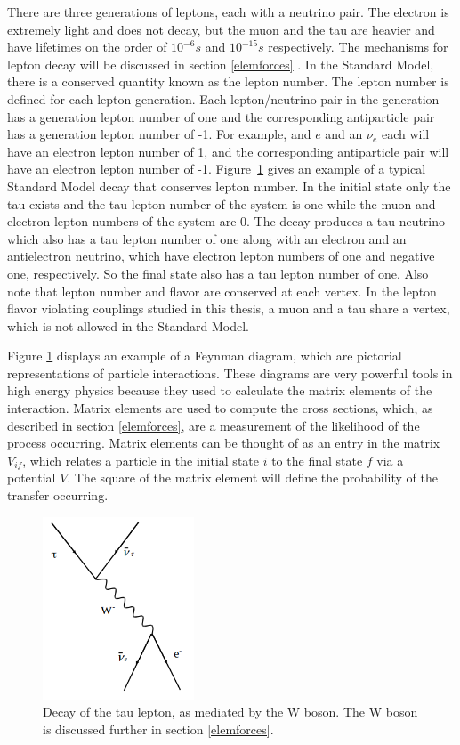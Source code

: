 \documentclass[oneside, letterpaper, oldfontcommands]{memoir}
\begin{document}
\qquad There are three generations of leptons, each with a neutrino pair. The electron is extremely light and does not decay, but the muon and the tau are heavier and have lifetimes on the order of $10^{-6}s$ and $10^{-15}s$ respectively\cite{Agashe:2014kda}. The mechanisms for lepton decay will be discussed in section \ref{elemforces} . In the Standard Model, there is a conserved quantity known as the lepton number. The lepton number is defined for each lepton generation. Each lepton/neutrino pair in the generation has a generation lepton number of one and the corresponding antiparticle pair has a generation lepton number of -1. For example, and $e$ and an $\nu_{e}$ each will have an electron lepton number of 1, and the corresponding antiparticle pair will have an electron lepton number of -1. Figure~\ref{fig:TauDecay} gives an example of a typical Standard Model decay that conserves lepton number. In the initial state only the tau exists and the tau lepton number of the system is one while the muon and electron lepton numbers of the system are 0. The decay produces a tau neutrino which also has a tau lepton number of one along with an electron and an antielectron neutrino, which have electron lepton numbers of one and negative one, respectively. So the final state also has a tau lepton number of one. Also note that lepton number and flavor are conserved at each vertex. In the lepton flavor violating couplings studied in this thesis, a muon and a tau share a vertex, which is not allowed in the Standard Model. 

Figure \ref{fig:TauDecay} displays an example of a Feynman diagram, which are pictorial representations of particle interactions. These diagrams are very powerful tools in high energy physics because they used to calculate the matrix elements of the interaction. Matrix elements are used to compute the cross sections, which, as described in section \ref{elemforces}, are a measurement of the likelihood of the process occurring. Matrix elements can be thought of as an entry in the matrix $V_{if}$, which relates a particle in the initial state $i$ to the final state $f$ via a potential $V$. The square of the matrix element will define the probability of the transfer occurring.

\begin{figure}[here]
\includegraphics[width=0.4\textwidth]{TauDecay.png}
\caption{Decay of the tau lepton, as mediated by the W boson. The W boson is discussed further in section \ref{elemforces}.}
\label{fig:TauDecay}
\end{figure}
\end{document}
